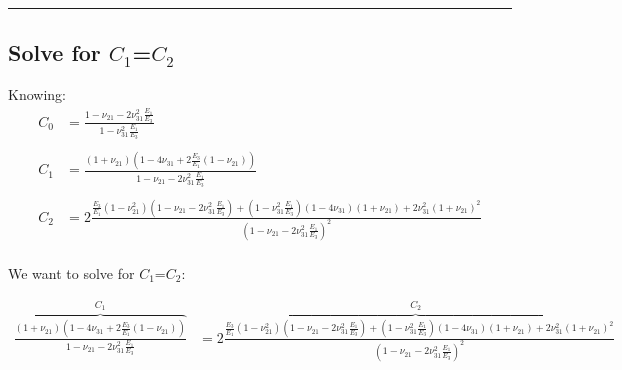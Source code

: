 \documentclass{article}
\begin{document}
\noindent\rule{8cm}{0.4pt}

\subsection{Solve for $C_1$=$C_2$}
Knowing:
\begin{align}
C_0 &= \frac{1-\nu_{21}-2\nu_{31}^2\frac{E_1}{E_3}}{1-\nu_{31}^2 \frac{E_1}{E_3}} \\
\\
C_1 &= \frac{\left( 1+\nu_{21} \right) \left( 1-4\nu_{31} + 2 \frac{E_3}{E_1} \left( 1-\nu_{21} \right) \right) }{ 1-\nu_{21}-2\nu_{31}^2\frac{E_1}{E_3} }  \\
\\
C_2 
&= 2 \frac{ \frac{E_3}{E_1} \left( 1-\nu_{21}^2 \right) \left( 1-\nu_{21}-2\nu_{31}^2\frac{E_1}{E_3}  \right) + \left( 1-\nu_{31}^2 \frac{E_1}{E_3} \right) \left(1-4\nu_{31} \right) \left(1+\nu_{21}\right) + 2\nu_{31}^2 \left( 1+\nu_{21} \right)^2 }{ \left( 1-\nu_{21}-2\nu_{31}^2\frac{E_1}{E_3} \right)^2 }   \\
\end{align}

We want to solve for $C_1$=$C_2$:

\begin{align*}
\overbrace{\frac{\left( 1+\nu_{21} \right) \left( 1-4\nu_{31} + 2 \frac{E_3}{E_1} \left( 1-\nu_{21} \right) \right) }{ 1-\nu_{21}-2\nu_{31}^2\frac{E_1}{E_3} } }^{C_1}
&= 
\overbrace{
2 \frac{
    \scriptstyle{
\frac{E_3}{E_1} \left( 1-\nu_{21}^2 \right) \left( 1-\nu_{21}-2\nu_{31}^2\frac{E_1}{E_3}  \right) + \left( 1-\nu_{31}^2 \frac{E_1}{E_3} \right) \left(1-4\nu_{31} \right) \left(1+\nu_{21}\right) + 2\nu_{31}^2 \left( 1+\nu_{21} \right)^2}
}{
\left( 1-\nu_{21}-2\nu_{31}^2\frac{E_1}{E_3} \right)^2 
} }^{C_2}  \tag{A}  \\
\end{align*}
\end{document}
